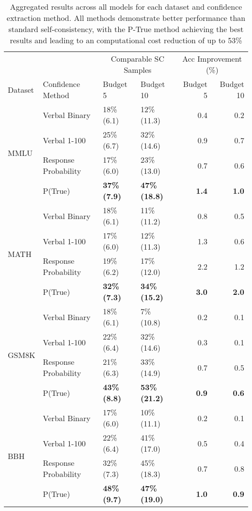 \begin{table*}[!h]
\centering
\begin{tabular}{llllrr}
\toprule
& & \multicolumn{2}{c}{Comparable SC Samples} & \multicolumn{2}{c}{Acc Improvement (\%)} \\
\cmidrule(lr){3-4} \cmidrule(lr){5-6}
Dataset & Confidence Method & Budget 5 & Budget 10 & Budget 5 & Budget 10 \\
\midrule
\multirow[t]{4}{*}{MMLU} & Verbal Binary & 18\% \small{(6.1)} & 12\% \small{(11.3)} & 0.4 & 0.2 \\
 & Verbal 1-100 & 25\% \small{(6.7)} & 32\% \small{(14.6)} & 0.9 & 0.7 \\
 & Response Probability & 17\% \small{(6.0)} & 23\% \small{(13.0)} & 0.7 & 0.6 \\
 & P(True) & \textbf{37\% \small{(7.9)}}& \textbf{47\% \small{(18.8)}} & \textbf{1.4} & \textbf{1.0} \\
\cline{1-6}
\multirow[t]{4}{*}{MATH} & Verbal Binary & 18\% \small{(6.1)} & 11\% \small{(11.2)} & 0.8 & 0.5 \\
 & Verbal 1-100 & 17\% \small{(6.0)} & 12\% \small{(11.3)} & 1.3 & 0.6 \\
 & Response Probability & 19\% \small{(6.2)} & 17\% \small{(12.0)} & 2.2 & 1.2 \\
 & P(True) & \textbf{32\% \small{(7.3)}} & \textbf{34\% \small{(15.2)}} & \textbf{3.0} & \textbf{2.0} \\
\cline{1-6}
\multirow[t]{4}{*}{GSM8K} & Verbal Binary & 18\% \small{(6.1)} & 7\% \small{(10.8)} & 0.2 & 0.1 \\
 & Verbal 1-100 & 22\% \small{(6.4)} & 32\% \small{(14.6)} & 0.3 & 0.1 \\
 & Response Probability & 21\% \small{(6.3)} & 33\% \small{(14.9)} & 0.7 & 0.5 \\
 & P(True) & \textbf{43\% \small{(8.8)}} & \textbf{53\% \small{(21.2)}} & \textbf{0.9} & \textbf{0.6} \\
\cline{1-6}
\multirow[t]{4}{*}{BBH} & Verbal Binary & 17\% \small{(6.0)} & 10\% \small{(11.1)} & 0.2 & 0.1 \\
 & Verbal 1-100 & 22\% \small{(6.4)} & 41\% \small{(17.0)} & 0.5 & 0.4 \\
 & Response Probability & 32\% \small{(7.3)} & 45\% \small{(18.3)} & 0.7 & 0.8 \\
 & P(True) & \textbf{48\% \small{(9.7)}} & \textbf{47\% \small{(19.0)}} & \textbf{1.0} & \textbf{0.9}\\
\bottomrule
\end{tabular}
\caption{ Aggregated results across all models for each dataset and confidence extraction method.  All methods demonstrate better performance than standard self-consistency, with the P-True method achieving the best results and leading to an computational cost reduction of up to 53\% }
\label{tab:apendix-all-results}
\end{table*}


